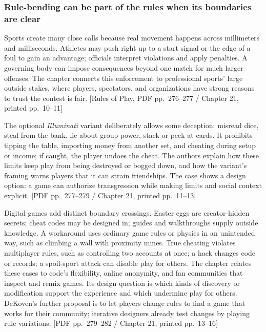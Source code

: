 \subsubsection{Rule-bending can be part of the rules when its boundaries are clear}\label{05-engine-i-ch009-rule-bending-can-be-part-of-the-rules-when-its-boundaries-are-clear}

\hypertarget{05-engine-i-ch009-rule-bending-can-be-part-of-the-rules-when-its-boundaries-are-clear}{}

Sports create many close calls because real movement happens across millimeters and milliseconds. Athletes may push right up to a start signal or the edge of a foul to gain an advantage; officials interpret violations and apply penalties. A governing body can impose consequences beyond one match for much larger offenses. The chapter connects this enforcement to professional sports' large outside stakes, where players, spectators, and organizations have strong reasons to trust the contest is fair. {[}Rules of Play, PDF pp.~276--277 / Chapter 21, printed pp.~10--11{]}

The optional \emph{Illuminati} variant deliberately allows some deception: misread dice, steal from the bank, lie about group power, stack or peek at cards. It prohibits tipping the table, importing money from another set, and cheating during setup or income; if caught, the player undoes the cheat. The authors explain how these limits keep play from being destroyed or bogged down, and how the variant's framing warns players that it can strain friendships. The case shows a design option: a game can authorize transgression while making limits and social context explicit. {[}PDF pp.~277--279 / Chapter 21, printed pp.~11--13{]}

Digital games add distinct boundary crossings. Easter eggs are creator-hidden secrets; cheat codes may be designed in; guides and walkthroughs supply outside knowledge. A workaround uses ordinary game rules or physics in an unintended way, such as climbing a wall with proximity mines. True cheating violates multiplayer rules, such as controlling two accounts at once; a hack changes code or records; a spoil-sport attack can disable play for others. The chapter relates these cases to code's flexibility, online anonymity, and fan communities that inspect and remix games. Its design question is which kinds of discovery or modification support the experience and which undermine play for others. DeKoven's further proposal is to let players change rules to find a game that works for their community; iterative designers already test changes by playing rule variations. {[}PDF pp.~279--282 / Chapter 21, printed pp.~13--16{]}


